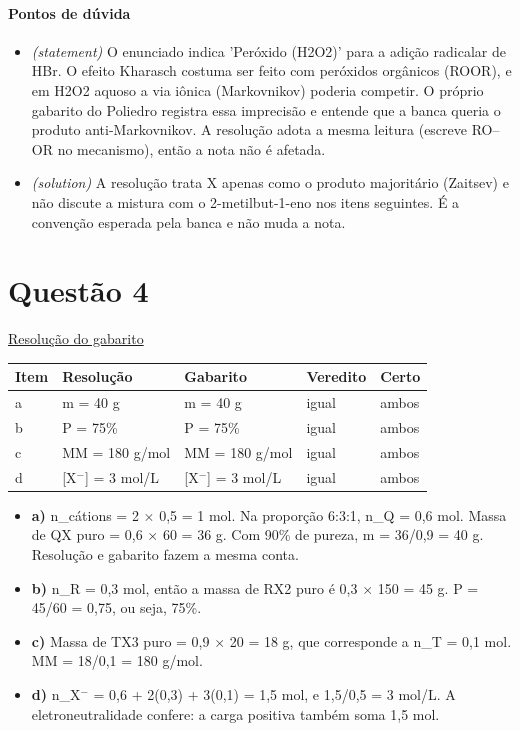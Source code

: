 \documentclass{article}%
\begin{document}
\paragraph{Pontos de dúvida}%
\begin{itemize}%
\item%
\textit{(statement)} O enunciado indica 'Peróxido (H2O2)' para a adição radicalar de HBr. O efeito Kharasch costuma ser feito com peróxidos orgânicos (ROOR), e em H2O2 aquoso a via iônica (Markovnikov) poderia competir. O próprio gabarito do Poliedro registra essa imprecisão e entende que a banca queria o produto anti{-}Markovnikov. A resolução adota a mesma leitura (escreve RO--OR no mecanismo), então a nota não é afetada.%
\item%
\textit{(solution)} A resolução trata X apenas como o produto majoritário (Zaitsev) e não discute a mistura com o 2{-}metilbut{-}1{-}eno nos itens seguintes. É a convenção esperada pela banca e não muda a nota.%
\end{itemize}%
\section*{Questão 4}%
\href{https://poliedroresolve.sistemapoliedro.com.br/vestibulares/ita/2027/ita-2-fase-dia-2-21-10-2026-2-fase-dia-2/dissertativa-4-quimica-2-fase-dia-2-ita-2027}{Resolução do gabarito}\par\smallskip%
\begin{longtable}{@{}p{} p{} p{} p{} p{}@{}}\toprule Item & Resolução & Gabarito & Veredito & Certo \\ \midrule
a & m = 40 g & m = 40 g & igual & ambos \\
b & P = 75\% & P = 75\% & igual & ambos \\
c & MM = 180 g/mol & MM = 180 g/mol & igual & ambos \\
d & {[}X$^{-}${]} = 3 mol/L & {[}X$^{-}${]} = 3 mol/L & igual & ambos \\
\bottomrule\end{longtable}%
\begin{itemize}%
\item%
\textbf{a)} n\_cátions = 2 $\times$ 0,5 = 1 mol. Na proporção 6:3:1, n\_Q = 0,6 mol. Massa de QX puro = 0,6 $\times$ 60 = 36 g. Com 90\% de pureza, m = 36/0,9 = 40 g. Resolução e gabarito fazem a mesma conta.%
\item%
\textbf{b)} n\_R = 0,3 mol, então a massa de RX2 puro é 0,3 $\times$ 150 = 45 g. P = 45/60 = 0,75, ou seja, 75\%.%
\item%
\textbf{c)} Massa de TX3 puro = 0,9 $\times$ 20 = 18 g, que corresponde a n\_T = 0,1 mol. MM = 18/0,1 = 180 g/mol.%
\item%
\textbf{d)} n\_X$^{-}$ = 0,6 + 2(0,3) + 3(0,1) = 1,5 mol, e 1,5/0,5 = 3 mol/L. A eletroneutralidade confere: a carga positiva também soma 1,5 mol.%
\end{itemize}%
\end{document}
